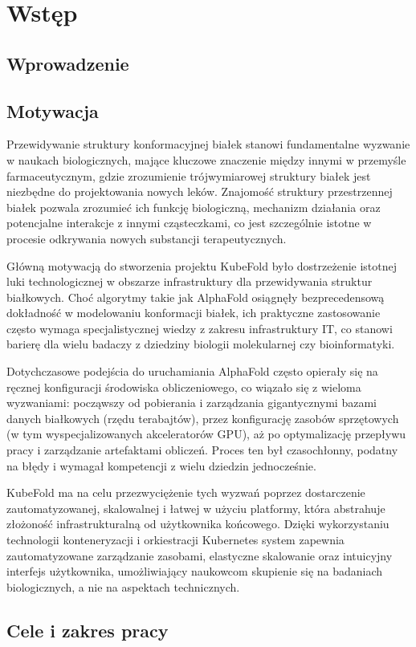 \chapter{Wstęp}


\section{Wprowadzenie}


\section{Motywacja}

Przewidywanie struktury konformacyjnej białek stanowi fundamentalne wyzwanie w naukach biologicznych, mające kluczowe znaczenie między innymi w przemyśle farmaceutycznym, gdzie zrozumienie trójwymiarowej struktury białek jest niezbędne do projektowania nowych leków.
Znajomość struktury przestrzennej białek pozwala zrozumieć ich funkcję biologiczną, mechanizm działania oraz potencjalne interakcje z innymi cząsteczkami, co jest szczególnie istotne w procesie odkrywania nowych substancji terapeutycznych.

Główną motywacją do stworzenia projektu KubeFold było dostrzeżenie istotnej luki technologicznej w obszarze infrastruktury dla przewidywania struktur białkowych.
Choć algorytmy takie jak AlphaFold osiągnęły bezprecedensową dokładność w modelowaniu konformacji białek, ich praktyczne zastosowanie często wymaga specjalistycznej wiedzy z zakresu infrastruktury IT, co stanowi barierę dla wielu badaczy z dziedziny biologii molekularnej czy bioinformatyki.

Dotychczasowe podejścia do uruchamiania AlphaFold często opierały się na ręcznej konfiguracji środowiska obliczeniowego, co wiązało się z wieloma wyzwaniami: począwszy od pobierania i zarządzania gigantycznymi bazami danych białkowych (rzędu terabajtów), przez konfigurację zasobów sprzętowych (w tym wyspecjalizowanych akceleratorów GPU), aż po optymalizację przepływu pracy i zarządzanie artefaktami obliczeń.
Proces ten był czasochłonny, podatny na błędy i wymagał kompetencji z wielu dziedzin jednocześnie.

KubeFold ma na celu przezwyciężenie tych wyzwań poprzez dostarczenie zautomatyzowanej, skalowalnej i łatwej w użyciu platformy, która abstrahuje złożoność infrastrukturalną od użytkownika końcowego.
Dzięki wykorzystaniu technologii konteneryzacji i orkiestracji Kubernetes system zapewnia zautomatyzowane zarządzanie zasobami, elastyczne skalowanie oraz intuicyjny interfejs użytkownika, umożliwiający naukowcom skupienie się na badaniach biologicznych, a nie na aspektach technicznych.


\section{Cele i zakres pracy}

